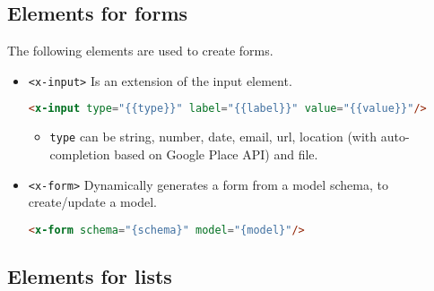 \subsection{Elements for forms}

The following elements are used to create forms.
\begin{itemize}
\item \texttt{<x-input>} Is an extension of the input element.
\begin{lstlisting}[language=html]
<x-input type="{{type}}" label="{{label}}" value="{{value}}"/>
\end{lstlisting}
\begin{itemize}
\item \texttt{type} can be string, number, date, email, url, location (with auto-completion based on Google Place API) and file.
\end{itemize}

\item \texttt{<x-form>} Dynamically generates a form from a model schema, to create/update a model.
\begin{lstlisting}[language=html]
<x-form schema="{schema}" model="{model}"/>
\end{lstlisting}
\end{itemize}

\subsection{Elements for lists}

